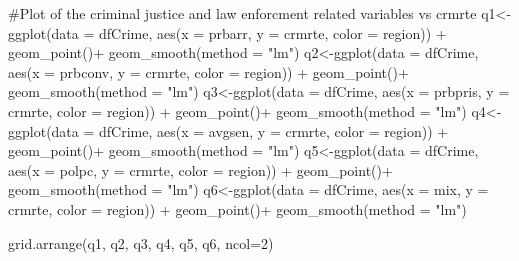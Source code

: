 \documentclass[]{article}
\newenvironment{Shaded}{}{}
\newcommand{\CommentTok}[1]{\textcolor[rgb]{0.00,0.50,0.00}{#1}}
\newcommand{\DataTypeTok}[1]{#1}
\newcommand{\DecValTok}[1]{#1}
\newcommand{\KeywordTok}[1]{\textcolor[rgb]{0.00,0.00,1.00}{#1}}
\newcommand{\NormalTok}[1]{#1}
\newcommand{\OperatorTok}[1]{#1}
\newcommand{\StringTok}[1]{\textcolor[rgb]{0.00,0.50,0.50}{#1}}
\begin{document}
\begin{Shaded}
\begin{Highlighting}[]
\CommentTok{#Plot of the criminal justice and law enforcment related variables vs crmrte}
\NormalTok{q1<-}\KeywordTok{ggplot}\NormalTok{(}\DataTypeTok{data =}\NormalTok{ dfCrime, }\KeywordTok{aes}\NormalTok{(}\DataTypeTok{x =}\NormalTok{ prbarr, }\DataTypeTok{y =}\NormalTok{ crmrte, }\DataTypeTok{color =}\NormalTok{ region)) }\OperatorTok{+}\StringTok{ }
\StringTok{      }\KeywordTok{geom_point}\NormalTok{()}\OperatorTok{+}
\StringTok{  }\KeywordTok{geom_smooth}\NormalTok{(}\DataTypeTok{method =} \StringTok{"lm"}\NormalTok{)}
\NormalTok{q2<-}\KeywordTok{ggplot}\NormalTok{(}\DataTypeTok{data =}\NormalTok{ dfCrime, }\KeywordTok{aes}\NormalTok{(}\DataTypeTok{x =}\NormalTok{ prbconv, }\DataTypeTok{y =}\NormalTok{ crmrte, }\DataTypeTok{color =}\NormalTok{ region)) }\OperatorTok{+}\StringTok{ }
\StringTok{      }\KeywordTok{geom_point}\NormalTok{()}\OperatorTok{+}
\StringTok{  }\KeywordTok{geom_smooth}\NormalTok{(}\DataTypeTok{method =} \StringTok{"lm"}\NormalTok{)}
\NormalTok{q3<-}\KeywordTok{ggplot}\NormalTok{(}\DataTypeTok{data =}\NormalTok{ dfCrime, }\KeywordTok{aes}\NormalTok{(}\DataTypeTok{x =}\NormalTok{ prbpris, }\DataTypeTok{y =}\NormalTok{ crmrte, }\DataTypeTok{color =}\NormalTok{ region)) }\OperatorTok{+}\StringTok{ }
\StringTok{      }\KeywordTok{geom_point}\NormalTok{()}\OperatorTok{+}
\StringTok{  }\KeywordTok{geom_smooth}\NormalTok{(}\DataTypeTok{method =} \StringTok{"lm"}\NormalTok{)}
\NormalTok{q4<-}\KeywordTok{ggplot}\NormalTok{(}\DataTypeTok{data =}\NormalTok{ dfCrime, }\KeywordTok{aes}\NormalTok{(}\DataTypeTok{x =}\NormalTok{ avgsen, }\DataTypeTok{y =}\NormalTok{ crmrte, }\DataTypeTok{color =}\NormalTok{ region)) }\OperatorTok{+}\StringTok{ }
\StringTok{      }\KeywordTok{geom_point}\NormalTok{()}\OperatorTok{+}
\StringTok{  }\KeywordTok{geom_smooth}\NormalTok{(}\DataTypeTok{method =} \StringTok{"lm"}\NormalTok{)}
\NormalTok{q5<-}\KeywordTok{ggplot}\NormalTok{(}\DataTypeTok{data =}\NormalTok{ dfCrime, }\KeywordTok{aes}\NormalTok{(}\DataTypeTok{x =}\NormalTok{ polpc, }\DataTypeTok{y =}\NormalTok{ crmrte, }\DataTypeTok{color =}\NormalTok{ region)) }\OperatorTok{+}\StringTok{ }
\StringTok{      }\KeywordTok{geom_point}\NormalTok{()}\OperatorTok{+}
\StringTok{  }\KeywordTok{geom_smooth}\NormalTok{(}\DataTypeTok{method =} \StringTok{"lm"}\NormalTok{)}
\NormalTok{q6<-}\KeywordTok{ggplot}\NormalTok{(}\DataTypeTok{data =}\NormalTok{ dfCrime, }\KeywordTok{aes}\NormalTok{(}\DataTypeTok{x =}\NormalTok{ mix, }\DataTypeTok{y =}\NormalTok{ crmrte, }\DataTypeTok{color =}\NormalTok{ region)) }\OperatorTok{+}\StringTok{ }
\StringTok{      }\KeywordTok{geom_point}\NormalTok{()}\OperatorTok{+}
\StringTok{  }\KeywordTok{geom_smooth}\NormalTok{(}\DataTypeTok{method =} \StringTok{"lm"}\NormalTok{)}

\KeywordTok{grid.arrange}\NormalTok{(q1, q2, q3, q4, q5, q6, }\DataTypeTok{ncol=}\DecValTok{2}\NormalTok{)}
\end{Highlighting}
\end{Shaded}
\end{document}

